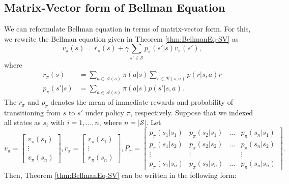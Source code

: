     \subsection{Matrix-Vector form of Bellman Equation}
        We can reformulate Bellman equation in terms of matrix-vector form. For this, we rewrite the Bellman equation given in Theorem \ref{thm:BellmanEq-SV} as
        \begin{equation}
            v_\pi(s) = r_\pi(s) + \gamma\sum_{s' \in \mathcal{S}}p_\pi(s'|s)v_\pi(s'),
        \end{equation}
        where
        \begin{align}
            r_\pi(s) &= \sum_{a \in \mathcal{A}(s)}\pi(a|s)\sum_{r \in \mathcal{R}(s,a)}p(r|s,a)r \\
            p_\pi(s'|s) &= \sum_{a \in \mathcal{A}(s)}\pi(a|s)p(s'|s,a).
        \end{align}
        The $r_\pi$ and $p_\pi$ denotes the mean of immediate rewards and probability of transitioning from $s$ to $s'$ under policy $\pi$, respectively.
        Suppose that we indexed all states as $s_i$ with $i = 1, \dots, n$, where $n=|\mathcal{S}|$.
        Let
        \begin{equation}
            v_\pi = \begin{bmatrix}
                    v_\pi(s_1) \\
                    \vdots \\
                    v_\pi(s_n)
                    \end{bmatrix},
            r_\pi = \begin{bmatrix}
                    r_\pi(s_1) \\
                    \vdots \\
                    r_\pi(s_n)
                    \end{bmatrix},
            P_\pi = \begin{bmatrix}
                    p_\pi(s_1|s_1) & p_\pi(s_2|s_1) & \dots & p_\pi(s_n|s_1) \\
                    p_\pi(s_1|s_2) & p_\pi(s_2|s_2) & \dots & p_\pi(s_n|s_2) \\
                    \vdots & \vdots &  & \vdots \\
                    p_\pi(s_1|s_n) & p_\pi(s_2|s_n) & \dots & p_\pi(s_n|s_n)
                    \end{bmatrix}. \label{eq:VecForm}
        \end{equation}
        Then, Theorem \ref{thm:BellmanEq-SV} can be written in the following form:
